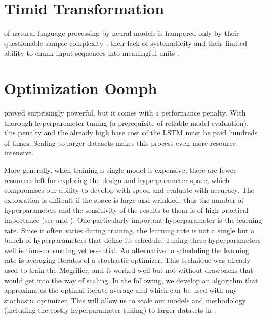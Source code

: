 \documentclass[12pt,a4paper,oneside]{book}
\begin{document}
\mglsep


\chapter{Timid Transformation}
\label{sec:timid-transformation}

of natural language processing by neural models is hampered only by their questionable sample complexity \citep{hoffmann2022training,wei2022emergent,belinkov2017synthetic,jia2017adversarial,iyyer2018adversarial,moosavi2017lexical,agrawal2016analyzing},
their lack of systematicity \citep{dziri2023faith,linzen2016assessing,kuncoro2018lstms} and their limited ability to chunk input sequences into meaningful units
\citep{cao-rimell-2021-evaluate,bostrom-durrett-2020-byte,wang2017sequence}.




\chapter{Optimization Oomph}
\label{sec:optimization-oomph}

proved surprisingly powerful, but it comes with a performance penalty.
With thorough hyperparemeter tuning (a prerequisite of reliable model evaluation), this penalty and the already high base cost of the LSTM must be paid hundreds of times.
Scaling to larger datasets makes this process even more resource intensive.

More generally, when training a single model is expensive, there are fewer resources left for exploring the design and hyperparameter space, which compromises our ability to develop with speed and evaluate with accuracy.
The exploration is difficult if the space is large and wrinkled, thus the number of hyperparameters and the sensitivity of the results to them is of high practical importance (see  and ).
One particularly important hyperparameter is the learning rate.
Since it often varies during training, the learning rate is not a single but a bunch of hyperparameters that define its schedule.
Tuning these hyperparameters well is time-consuming yet essential.
An alternative to scheduling the learning rate is averaging iterates of a stochastic optimizer.
This technique was already used to train the Mogrifier, and it worked well but not without drawbacks that would get into the way of scaling.
In the following, we develop an algorithm that approximates the optimal iterate average and which can be used with any stochastic optimizer.
This will allow us to scale our models and methodology (including the costly hyperparameter tuning) to larger datasets in .
\end{document}
